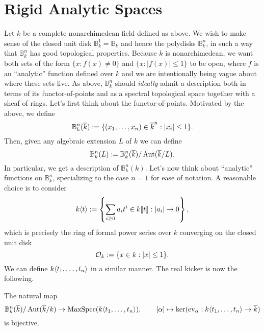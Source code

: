 \documentclass[11pt]{article}
\newcommand{\B}{\mathbb{B}}
\begin{document}
\section{Rigid Analytic Spaces}
Let $k$ be a complete nonarchimedean field defined as above. We wish to make sense of the closed unit disk $\B_k^1=\B_k$ and hence the polydisks $\B_k^n$, in such a way that $\B_k^n$ has good topological properties. Because $k$ is nonarchimedean, we want both sets of the form $\{x : f(x)\neq0\}$ and $\{x : |f(x)|\leq1\}$ to be open, where $f$ is an ``analytic'' function defined over $k$ and we are intentionally being vague about where these sets live. As above, $\B_k^n$ should \emph{ideally} admit a description both in terms of its functor-of-points and as a spectral topological space together with a sheaf of rings. Let's first think about the functor-of-points. Motivated by the above, we define
$$\B_k^n(\ov{k}):=\{(x_1,\ldots,x_n)\in\ov{k}^n : |x_i|\leq1\}.$$
Then, given any algebraic extension $L$ of $k$ we can define 
$$\B_k^n(L):=\B_k^n(\ov{k})/\Aut(\ov{k}/L).$$
In particular, we get a description of $\B_k^n(k)$. Let's now think about ``analytic'' functions on $\B_k^n$, specializing to the case $n=1$ for ease of notation. A reasonable choice is to consider 
$$k\!\left\langle t\right\rangle:=\left\{\sum_{i\geq0}a_it^i\in k\!\left\llbracket{t}\right\rrbracket : |a_i|\to0\right\},$$
which is precisely the ring of formal power series over $k$ converging on the closed unit disk 
$$\mathcal{O}_k:=\{x\in k : |x|\leq1\}.$$ 
We can define $k\!\left\langle t_1,\ldots,t_n\right\rangle$ in a similar manner. The real kicker is now the following. 

\begin{proposition}
The natural map 
$$\B_k^n(\ov{k})/\Aut(\ov{k}/k)\to\MaxSpec(k\ip{t_1,\ldots,t_n}),\qquad [\alpha]\mapsto\ker(\ev_{\alpha}: k\ip{t_1,\ldots,t_n}\to\ov{k})$$ 
is bijective.
\end{proposition}
\end{document}
